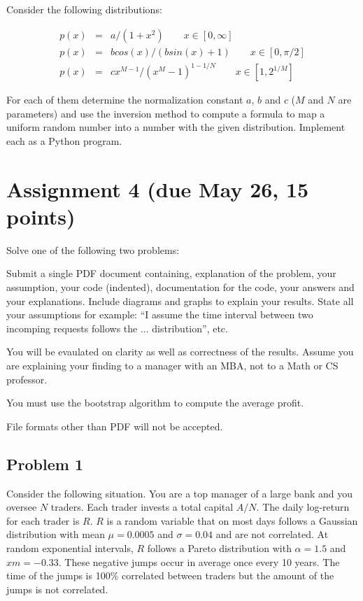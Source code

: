 \documentclass[12pt]{article}
\begin{document}
Consider the following distributions:

\begin{eqnarray}
p(x) &=& a/(1+x^2) \qquad x\in[0,\infty] \\
p(x) &=& b cos(x)/(b sin(x) + 1)  \qquad x \in [0,\pi/2] \\
p(x) &=& c x^{M-1}/(x^M-1)^{1-1/N} \qquad x \in [1,2^{1/M}] 
\end{eqnarray}

For each of them determine the normalization constant $a$, $b$ and $c$ ($M$ and $N$ are parameters) and use the inversion method to compute a formula to map a uniform random number into a number with the given distribution. Implement each as a Python program.

\section{Assignment 4 (due May 26, 15 points)}

Solve one of the following two problems:

Submit a single PDF document containing, explanation of the problem, your assumption, your code (indented), documentation for the code, your answers and your explanations. Include diagrams and graphs to explain your results. State all your assumptions for example: ``I assume the time interval between two incomping requests follows the ... distribution'', etc.

You will be evaulated on clarity as well as correctness of the results. Assume you are explaining your finding to a manager with an MBA, not to a Math or CS professor.

You must use the bootstrap algorithm to compute the average profit.

File formats other than PDF will not be accepted.

\subsection{Problem 1}

Consider the following situation. You are a top manager of a large bank and you oversee $N$ traders. Each trader invests a total capital $A/N$. The daily log-return for each trader is $R$. $R$ is a random variable that on most days follows a Gaussian distribution with mean $\mu = 0.0005$ and $\sigma = 0.04$ and are not correlated.  At random exponential intervals, $R$ follows a Pareto distribution with $\alpha=1.5$ and $xm=-0.33$. These negative jumps occur in average once every 10 years. The time of the jumps is 100\% correlated between traders but the amount of the jumps is not correlated.
\end{document}
